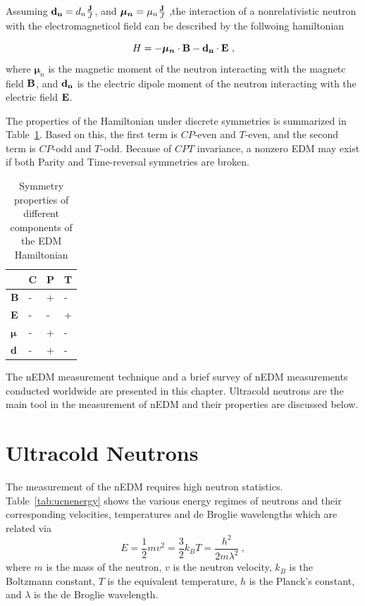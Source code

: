 Assuming ${\bf{d_n}} = d_n \frac{\bf{J}}{J}$, and
$\boldsymbol{\mu_n} = \mu_n \frac{\bf{J}}{J}$ ,the interaction of a
nonrelativistic neutron with the electromagneticol field can be
described by the follwoing hamiltonian

\begin{equation}
  \label{eqn:hamiltonian}
 H= -\boldsymbol{\mu_n} \cdot \bf{B} - \bf{d}_n \cdot \bf{E}~,
 \end{equation}
where $\boldsymbol{\mu}_n$ is the magnetic moment of the neutron
interacting with the magnetc field $\bf{B}$, and $\bf{d}_n$ is
the electric dipole moment of the neutron interacting with the
electric field $\bf{E}$.

The properties of the Hamiltonian under discrete symmetries is
summarized in Table~\ref{tab:Hsymmetry}. Based on this, the first term
is $CP$-even and $T$-even, and the second term is $CP$-odd and
$T$-odd. Because of $CPT$ invariance, a nonzero EDM may exist if
both Parity and Time-reversal symmetries are broken.


\begin{table}[h!]
\begin{center}
\begin{tabular}{| l | l | l | l |} 
\hline
 & C & P & T \\ \hline
\textbf{B} & - &+ &- \\ \hline
\textbf{E} & -&- &+ \\ \hline
$\boldsymbol{\mu}$ &- &+ &- \\ \hline 
\textbf{d} & -&+ &- \\ \hline
\end{tabular}
\caption{Symmetry properties of different components of the EDM
  Hamiltonian  \label{tab:Hsymmetry}}
\end{center}
\end{table}
  
The nEDM measurement technique and a brief survey of nEDM measurements
conducted worldwide are presented in this chapter. Ultracold neutrons
are the main tool in the measurement of nEDM and their properties are
discussed below.
\section{Ultracold Neutrons\label{sec:ucnproperties}}
The measurement of the nEDM requires high neutron statistics.
Table~\ref{tab:ucnenergy} shows the various energy regimes of neutrons
and their corresponding velocities, temperatures and de Broglie
wavelengths which are related via
\begin{equation}
  \label{eqn:ucnenergy}
  E = \frac{1}{2} m v^2 = \frac{3}{2} k_B T = \frac{h^2}{2m \lambda^2}~,
\end{equation}
where $m$ is the mass of the neutron, $v$ is the neutron velocity,
$k_B$ is the Boltzmann constant, $T$ is the equivalent temperature,
$h$ is the Planck's constant, and $\lambda$ is the de Broglie
wavelength.

